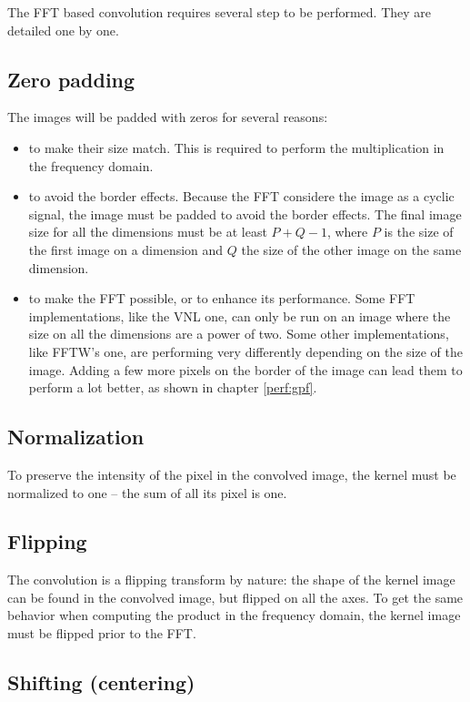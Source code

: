 \documentclass{InsightArticle}
\begin{document}
The FFT based convolution requires several step to be performed. They are detailed one by one.

\subsection{Zero padding}

The images will be padded with zeros for several reasons:
\begin{itemize}
  \item to make their size match. This is required to perform the multiplication in the frequency
  domain.
  \item  to avoid the border effects. Because the FFT considere the image as a cyclic signal, the
  image must be padded to avoid the border effects. The final image size for all the dimensions
  must be at least $P+Q-1$, where $P$ is the size of the first image on a dimension and $Q$ the size
  of the other image on the same dimension.
  \item to make the FFT possible, or to enhance its performance. Some FFT implementations, like the
  VNL one, can only be run on an image where the size on all the dimensions are a power of two.
  Some other implementations, like FFTW's one, are performing very differently depending on the
  size of the image. Adding a few more pixels on the border of the image can lead them to perform
  a lot better, as shown in chapter \ref{perf:gpf}.
\end{itemize}

\subsection{Normalization}

To preserve the intensity of the pixel in the convolved image, the kernel must be normalized to one
-- the sum of all its pixel is one.

\subsection{Flipping}

The convolution is a flipping transform by nature: the shape of the kernel image can be found in the
convolved image, but flipped on all the axes. To get the same behavior when computing the product
in the frequency domain, the kernel image must be flipped prior to the FFT.

\subsection{Shifting (centering)}
\end{document}
